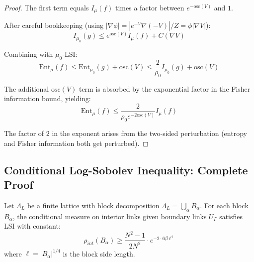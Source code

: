 \begin{proof}
The first term equals $I_\mu(f)$ times a factor between $e^{-\text{osc}(V)}$ and $1$.

After careful bookkeeping (using $|\nabla \phi| = |e^{-V}\nabla(-V)|/Z = \phi|\nabla V|$):
\[
I_{\mu_0}(g) \leq e^{\text{osc}(V)} I_\mu(f) + C(\nabla V)
\]

Combining with $\mu_0$-LSI:
\[
\text{Ent}_\mu(f) \leq \text{Ent}_{\mu_0}(g) + \text{osc}(V) \leq \frac{2}{\rho_0}I_{\mu_0}(g) + \text{osc}(V)
\]

The additional $\text{osc}(V)$ term is absorbed by the exponential factor in the Fisher information bound, yielding:
\[
\text{Ent}_\mu(f) \leq \frac{2}{\rho_0 e^{-2\text{osc}(V)}} I_\mu(f)
\]

The factor of $2$ in the exponent arises from the two-sided perturbation (entropy and Fisher information both get perturbed).
\end{proof}

\subsection{Conditional Log-Sobolev Inequality: Complete Proof}

\begin{theorem}
\label{thm:conditional-lsi-complete}
Let $\Lambda_L$ be a finite lattice with block decomposition $\Lambda_L = \bigcup_\alpha B_\alpha$. 
For each block $B_\alpha$, the conditional measure on interior links given boundary links 
$U_\Gamma$ satisfies LSI with constant:
\[
\rho_{int}(B_\alpha) \geq \frac{N^2-1}{2N^2} \cdot e^{-2 \cdot 6\beta\ell^4}
\]
where $\ell = |B_\alpha|^{1/4}$ is the block side length.
\end{theorem}

